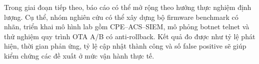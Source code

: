 \documentclass[../DoAn.tex]{subfiles}
\begin{document}
Trong giai đoạn tiếp theo, báo cáo có thể mở rộng theo hướng thực nghiệm định lượng. Cụ thể, nhóm nghiên cứu có thể xây dựng bộ firmware benchmark có nhãn, triển khai mô hình lab gồm CPE--ACS--SIEM, mô phỏng botnet telnet và thử nghiệm quy trình OTA A/B có anti-rollback. Kết quả đo được như tỷ lệ phát hiện, thời gian phản ứng, tỷ lệ cập nhật thành công và số false positive sẽ giúp kiểm chứng các đề xuất ở mức vận hành thực tế.
\end{document}

